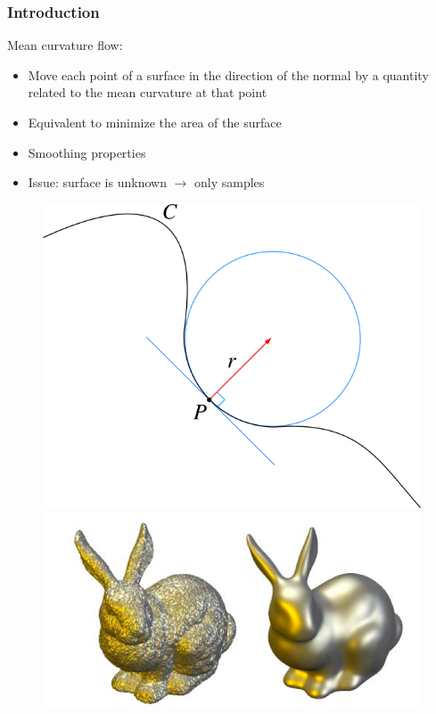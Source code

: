 \documentclass{beamer}
\begin{document}
\begin{frame}
    \frametitle{Introduction}

    Mean curvature flow:
    \begin{itemize}
        \item Move each point of a surface in the direction of the normal by a
            quantity related to the mean curvature at that point
        \item Equivalent to minimize the area of the surface
        \item Smoothing properties
        \item Issue: surface is unknown $ \to $ only samples
    \end{itemize}

    \begin{figure}
        \centering
        \includegraphics[scale=0.25]{img/osculating-circle}
        \includegraphics[scale=0.22]{img/mean-curvature-flow-rabbit}
    \end{figure}
\end{frame}
\end{document}
